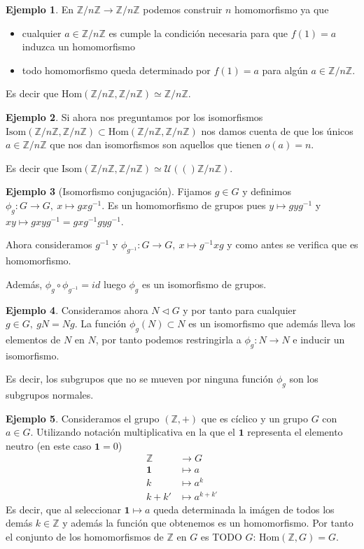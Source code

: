 \documentclass{book}
\theoremstyle{definition}
\newtheorem{ej}{Ejemplo}
\theoremstyle{remark}
\newcommand{\normsub}{\mathbin{\triangleleft}}
\newcommand{\uds}[1]{\mathcal{U}(#1)}
\newcommand{\inv}[1]{#1^{-1}}
\newcommand{\isom}{\simeq}
\newcommand{\Z}{\mathbb{Z}}
\newcommand{\ZnZ}{\mathbb{Z}/n\mathbb{Z}}
\begin{document}
\begin{ej}
	En $\ZnZ \to \ZnZ$ podemos construir $n$ homomorfismo ya que
	\begin{itemize}
		\item cualquier $a \in \ZnZ$ es cumple la condición necesaria para que $f(1) = a$ induzca un homomorfismo
		\item todo homomorfismo queda determinado por $f(1) = a$ para algún $a \in \ZnZ$.
	\end{itemize}

	Es decir que $\text{Hom}(\ZnZ, \ZnZ) \isom \ZnZ$.
\end{ej}

\begin{ej}
	Si ahora nos preguntamos por los isomorfismos $\text{Isom}(\ZnZ, \ZnZ) \subset \text{Hom}(\ZnZ, \ZnZ)$ nos damos cuenta de que los únicos $a \in \ZnZ$ que nos dan isomorfismos son aquellos que tienen $o(a) = n$.
	
	Es decir que $\text{Isom}(\ZnZ, \ZnZ) \isom \uds(\ZnZ)$.
\end{ej}

\begin{ej}[Isomorfismo conjugación]
	Fijamos $g \in G$ y definimos $\phi_g:G \to G,\ x \mapsto gx\inv{g}$. Es un homomorfismo de grupos pues $y\mapsto gy\inv{g}$ y $xy \mapsto gxy\inv{g} = gx\inv{g}gy\inv{g}$.
	
	Ahora consideramos $\inv{g}$ y $\phi_{\inv{g}}: G \to G,\ x \mapsto \inv{g}xg$ y como antes se verifica que es homomorfismo.
	
	Además, $\phi_g \circ \phi_{\inv{g}} = id$ luego $\phi_g$ es un isomorfismo de grupos.
\end{ej}


\begin{ej}
	Consideramos ahora $N \normsub G$ y por tanto para cualquier $g \in G,\ gN = Ng$. La función $\phi_g(N) \subset N$ es un isomorfismo que además lleva los elementos de $N$ en $N$, por tanto podemos restringirla a $\phi_g:N \to N$ e inducir un isomorfismo.

	Es decir, los subgrupos que no se mueven por ninguna función $\phi_g$ son los subgrupos normales.
\end{ej}

\begin{ej}
	Consideramos el grupo $(\Z, +)$ que es cíclico y un grupo $G$ con $a \in G$. Utilizando notación multiplicativa en la que el $\mathbf{1}$ representa el elemento neutro (en este caso $\mathbf{1} = 0$)
	\begin{align*}
		\Z &\to G \\
		\mathbf{1} &\mapsto a \\
		k &\mapsto a^k \\
		k + k' &\mapsto a^{k+k'}
	\end{align*}
	Es decir, que al seleccionar $\mathbf{1} \mapsto a$ queda determinada la imágen de todos los demás $k \in \Z$ y además la función que obtenemos es un homomorfismo. Por tanto el conjunto de los homomorfismos de $\Z$ en $G$ es TODO $G$: $\text{Hom}(\Z, G) = G$.
\end{ej}
\end{document}
